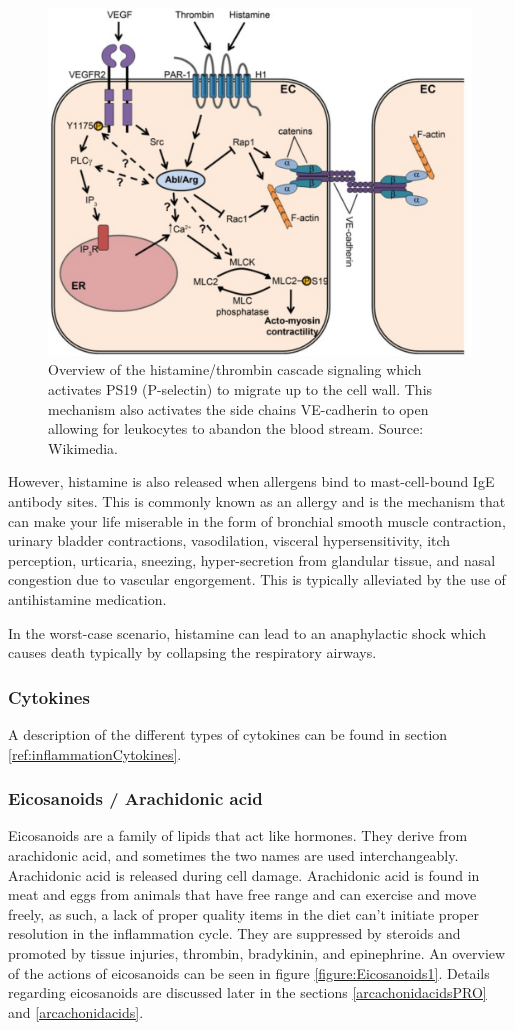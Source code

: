     \begin{figure}[ht]
        \centering
            \includegraphics[width=0.5\linewidth]{figures/Inflammation/HistaminPselectin.png} 
        \caption{Overview of the histamine/thrombin cascade signaling which activates PS19 (P-selectin) to migrate up to the cell wall. This mechanism also activates the side chains VE-cadherin to open allowing for leukocytes to abandon the blood stream. Source: Wikimedia. \label{figure:histamine}}
    \end{figure}  

However, histamine is also released when allergens bind to mast-cell-bound IgE antibody sites. This is commonly known as an allergy and is the mechanism that can make your life miserable in the form of bronchial smooth muscle contraction, urinary bladder contractions, vasodilation, visceral hypersensitivity, itch perception, urticaria, sneezing, hyper-secretion from glandular tissue, and nasal congestion due to vascular engorgement. This is typically alleviated by the use of antihistamine medication.

In the worst-case scenario, histamine can lead to an anaphylactic shock which causes death typically by collapsing the respiratory airways.

\subsubsection{Cytokines}

A description of the different types of cytokines can be found in section \ref{ref:inflammationCytokines}.
   
\subsubsection{Eicosanoids / Arachidonic acid}
\label{eicosanoids}

   Eicosanoids are a family of lipids that act like hormones. They derive from arachidonic acid, and sometimes the two names are used interchangeably. Arachidonic acid is released during cell damage. Arachidonic acid is found in meat and eggs from animals that have free range and can exercise and move freely, as such, a lack of proper quality items in the diet can't initiate proper resolution in the inflammation cycle. They are suppressed by steroids and promoted by tissue injuries, thrombin, bradykinin, and epinephrine. An overview of the actions of eicosanoids can be seen in figure \ref{figure:Eicosanoids1}. Details regarding eicosanoids are discussed later in the sections \ref{arcachonidacidsPRO} and \ref{arcachonidacids}.
    
